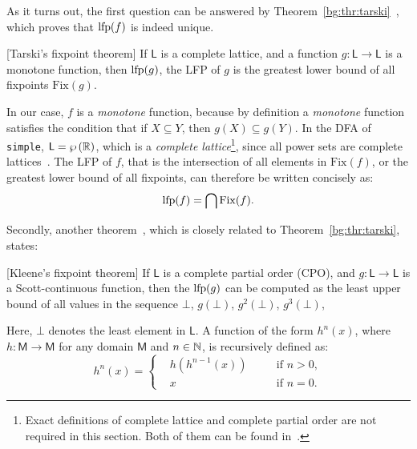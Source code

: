 As it turns out, the first question can be answered by
Theorem~\ref{bg:thr:tarski}~\cite{tarski55, nielson99}, which proves that $\operatorname{\mathrm{lfp}}
(f)$ is indeed unique.
\begin{theorem}
    \textup{[Tarski's fixpoint theorem]}
    If $\mathsf{L}$ is a complete lattice, and a function $g:
    \mathsf{L} \to \mathsf{L}$ is a monotone function, then $\operatorname{\mathrm{lfp}}(g)$,
    the LFP of $g$ is the greatest lower bound of all fixpoints
    $\mathrm{Fix}(g)$.\label{bg:thr:tarski}
\end{theorem}

In our case, $f$ is a \emph{monotone} function, because by definition a
\emph{monotone} function satisfies the condition that if $X \subseteq Y$,
then $g(X) \subseteq g(Y)$.  In the DFA of \verb|simple|, $\mathsf{L} =
\wp\left({\mathbb{R}}\right)$, which is a \emph{complete lattice}\footnote{%
    Exact definitions of complete lattice and complete partial order are not
    required in this section.  Both of them can be found in~\cite{nielson99}.
}, since all power sets are complete lattices~\cite{nielson99}.  The LFP of
$f$, that is the intersection of all elements in $\mathrm{Fix}(f)$, or the
greatest lower bound of all fixpoints, can therefore be written concisely as:
\begin{equation}
    \operatorname{\mathrm{lfp}} (f) = \bigcap \mathrm{Fix}(f).
\end{equation}

Secondly, another theorem~\cite{kleene52}, which is closely
related to Theorem~\ref{bg:thr:tarski}, states:
\begin{theorem}
    \textup{[Kleene's fixpoint theorem]}
    If $\mathsf{L}$ is a complete partial order (CPO), and $g: \mathsf{L} \to
    \mathsf{L}$ is a Scott-continuous function, then the $\operatorname{\mathrm{lfp}} (g)$ can be
    computed as the least upper bound of all values in the sequence $\bot$,
    $g(\bot)$, $g^2(\bot)$, $g^3(\bot)$, \textellipsis{}\label{bg:thr:kleene}
\end{theorem}
Here, $\bot$ denotes the least element in $\mathsf{L}$.  A function of the form
$h^n(x)$, where $h: \mathsf{M} \to \mathsf{M}$ for any domain $\mathsf{M}$ and
$n \in \mathbb{N}$, is recursively defined as:
\begin{equation}
    h^n(x) = \left\{
        \begin{aligned}
            & h(h^{n-1}(x)) \quad && \text{if~} n > 0, \\
            & x && \text{if~} n = 0.
        \end{aligned}
    \right.
\end{equation}

